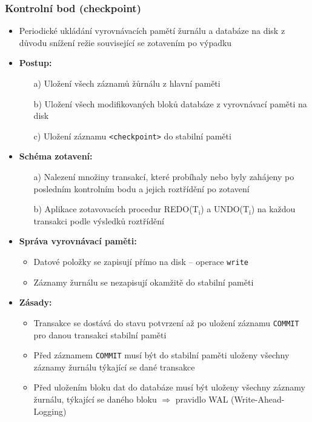 \documentclass[a4paper,10pt]{article}
\newcommand{\pojem}[2]{\item \textbf{#1:}\quad #2}
\newcommand{\tedy}{$\Rightarrow$ }
\begin{document}
			\subsubsection{Kontrolní bod (checkpoint)}
				\begin{itemize}
					\item Periodické ukládání vyrovnávacích pamětí žurnálu a databáze na disk z důvodu snížení režie související se zotavením po výpadku
					\pojem{Postup}
					\begin{itemize}
						\item[a)] Uložení všech záznamů žůrnálu z hlavní paměti
						\item[b)] Uložení všech modifikovaných bloků databáze z vyrovnávací paměti na disk
						\item[c)] Uložení záznamu \texttt{<checkpoint>} do stabilní paměti
					\end{itemize}
					\pojem{Schéma zotavení}
					\begin{itemize}
						\item[a)] Nalezení množiny transakcí, které probíhaly nebo byly zahájeny po posledním kontrolním bodu a jejich roztřídění po zotavení
						\item[b)] Aplikace zotavovacích procedur REDO(T$_\textrm{i}$) a UNDO(T$_\textrm{i}$) na každou transakci podle výsledků roztřídění
					\end{itemize}
					\begin{figure}[h!]
						\centering
					\end{figure}
										
					\pojem{Správa vyrovnávací paměti}
					\begin{itemize}
						\item Datové položky se zapisují přímo na disk -- operace \texttt{write}
						\item Záznamy žurnálu se nezapisují okamžitě do stabilní paměti
					\end{itemize}
					\pojem{Zásady}
					\begin{itemize}
						\item Transakce se dostává do stavu potvrzení až po uložení záznamu \texttt{COMMIT} pro danou transakci stabilní paměti
						\item Před záznamem \texttt{COMMIT} musí být do stabilní paměti uloženy všechny záznamy žurnálu týkající se dané transakce
						\item Před uložením bloku dat do databáze musí být uloženy všechny záznamy žurnálu, týkající se daného bloku \tedy pravidlo WAL (Write-Ahead-Logging)
					\end{itemize}
				\end{itemize}
				
\end{document}
